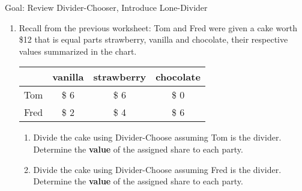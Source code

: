\documentclass[12pt]{article}
\renewcommand{\emph}[1]{\textsf{\textbf{#1}}}
\begin{document}
Goal: Review Divider-Chooser, Introduce Lone-Divider
\begin{enumerate}
\item Recall from the previous worksheet: \quad Tom and Fred were given a cake worth \$12 that is equal parts strawberry, vanilla and chocolate, their respective values summarized in the chart.\\
\begin{multicols}{2}
\begin{tabular}{c||ccc}
&vanilla&strawberry&chocolate\\
\hline \hline
Tom&\$ 6 & \$ 6 & \$ 0\\
Fred&\$ 2&\$ 4 & \$ 6
\end{tabular}
\end{multicols}
	\begin{enumerate}
	\item Divide the cake using Divider-Choose assuming Tom is the divider. Determine the \emph{value} of the assigned share to each party.\\
\vfill	
	\item Divide the cake using Divider-Choose assuming Fred is the divider. Determine the \emph{value} of the assigned share to each party.\\
\\
\end{enumerate}
\end{enumerate}
\end{document}

